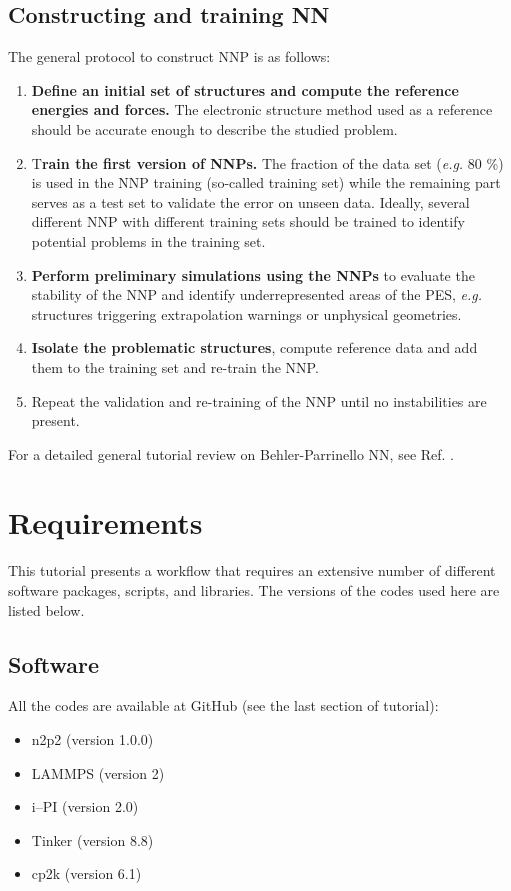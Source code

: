 \documentclass[12pt]{article}
\begin{document}
\subsection{Constructing and training NN}
The general protocol to construct NNP is as follows:
\begin{enumerate}
    \item \textbf{Define an initial set of structures and compute the reference energies and forces.} The electronic structure method used as a reference should be accurate enough to describe the studied problem.
    \item T\textbf{rain the first version of NNPs.} The fraction of the data set (\textit{e.g.} 80 \%) is used in the NNP training (so-called training set) while the remaining part serves as a test set to validate the error on unseen data. Ideally, several different NNP with different training sets should be trained to identify potential problems in the training set.
    \item \textbf{Perform preliminary simulations using the NNPs} to evaluate the stability of the NNP and identify underrepresented areas of the PES, \textit{e.g.} structures triggering extrapolation warnings or unphysical geometries.
    \item \textbf{Isolate the problematic structures}, compute reference data and add them to the training set and re-train the NNP.
    \item Repeat the validation and re-training of the NNP until no instabilities are present.
\end{enumerate}

For a detailed general tutorial review on Behler-Parrinello NN, see Ref. . 

\newpage
{}
\section{Requirements}
This tutorial presents a workflow that requires an extensive number of different software packages, scripts, and libraries. The versions of the codes used here are listed below.
\subsection{Software}
All the codes are available at GitHub (see the last section of tutorial):
\begin{itemize}
    \item n2p2 (version 1.0.0)
    \item LAMMPS (version 2)
    \item i--PI (version 2.0)
    \item Tinker (version 8.8)
    \item cp2k (version 6.1)
\end{itemize}
\end{document}
